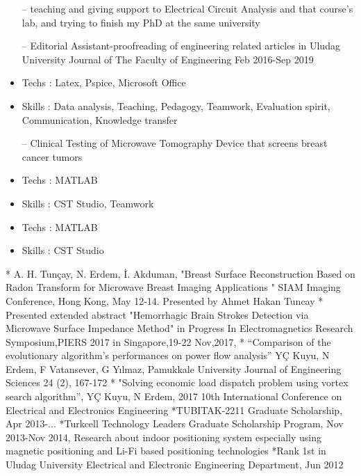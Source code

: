\documentclass[10pt,a4paper,ragged2e,withhyper]{altacv}
\begin{document}
\begin{paracol}{1}
\begin{itemize}
    \setlength{\itemindent}{0.5em}
    \item[--]   \small {teaching and giving support to Electrical Circuit Analysis and that
    course's lab, and trying to finish my PhD at the same university }
    \item[--]   \small {Editorial Assistant-proofreading of engineering related articles in Uludag University Journal of The Faculty of Engineering Feb 2016-Sep 2019}
    \item Techs : Latex, Pspice, Microsoft Office
    \item Skills : Data analysis, Teaching, Pedagogy, Teamwork, Evaluation spirit, Communication, Knowledge transfer
\end{itemize}
\begin{itemize}
  \setlength{\itemindent}{0.5em}
    \item[--]  \small {Clinical Testing of Microwave Tomography Device that screens breast cancer tumors}
  \item Techs : MATLAB
   \item Skills : CST Studio, Teamwork
\end{itemize}
\begin{itemize}
    \setlength{\itemindent}{0.5em}
    \item Techs : MATLAB
   \item Skills : CST Studio
\end{itemize}
* A. H. Tunçay, N. Erdem, İ. Akduman, "Breast Surface Reconstruction Based on Radon Transform for Microwave Breast Imaging Applications " SIAM Imaging Conference, Hong Kong, May 12-14.
Presented by Ahmet Hakan Tuncay
* Presented extended abstract "Hemorrhagic Brain Strokes Detection via Microwave Surface Impedance Method" in Progress In Electromagnetics Research Symposium,PIERS 2017 in Singapore,19-22 Nov,2017,
* “Comparison of the evolutionary algorithm's performances on power flow analysis” YÇ Kuyu, N Erdem, F Vatansever, G Yılmaz,
Pamukkale University Journal of Engineering Sciences 24 (2), 167-172 
* "Solving economic load dispatch problem using vortex search algorithm”, YÇ Kuyu, N Erdem, 2017 10th International Conference on Electrical and Electronics Engineering 
*TUBITAK-2211 Graduate Scholarship, Apr 2013-...
*Turkcell Technology Leaders Graduate Scholarship Program,
Nov 2013-Nov 2014, Research about indoor positioning system especially using magnetic positioning and Li-Fi based positioning technologies
*Rank 1st in Uludag University Electrical and Electronic Engineering Department, Jun 2012 


\end{paracol}
\end{document}
